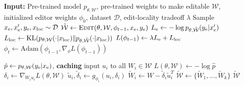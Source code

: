 \documentclass{article}
\begin{document}
\begin{minipage}[t]{0.43\textwidth}
\begin{algorithm}[H]
\caption{Editor Training}\label{alg:edit-procedure}
\begin{algorithmic}[1]



\State \textbf{Input:} Pre-trained model $p_{\theta,\mathcal{W}}$, pre-trained weights to make editable $\mathcal{W}$, initialized editor weights $\phi_0$, dataset $\mathcal{D}$, edit-locality tradeoff $\lambda$
    \State Sample $x_\text{e},x_\text{e}',y_\text{e},x_\text{loc}\sim \mathcal{D}$
    \State $\mathcal{\tilde W} \gets \textsc{Edit}(\theta,\mathcal{W},\phi_{t-1},x_\text{e},y_\text{e})$
    \State $L_\text{e} \gets -\log p_{\theta,\mathcal{\tilde W}}(y_\text{e}|x_\text{e}')$
    \State $L_\text{loc} \gets \text{KL}(p_{\theta,\mathcal{W}}(\cdot|x_\text{loc}) \| p_{\theta,\mathcal{\tilde W}}(\cdot|x_\text{loc}))$
    \State $L(\phi_{t-1}) \gets \lambda L_\text{e} + L_\text{loc}$
    \State $\phi_t \gets \text{Adam}\left(\phi_{t-1}, \nabla_\phi L(\phi_{t-1})\right)$
\EndFor





\end{algorithmic}
\end{algorithm}
\end{minipage}
\begin{minipage}[t]{0.565\textwidth}
\begin{algorithm}[H]
\caption{Edit Procedure}\label{alg:training}
\begin{algorithmic}[1]



    \State $\hat{p} \gets p_{\theta,\mathcal{W}}(y_\text{e}|x_\text{e})$, \textbf{caching} input $u_i$ to all $W_i\in\mathcal{W}$
    \State $L(\theta, \mathcal{W})\gets -\log \hat{p}$ 
        \State $\delta_i \gets \nabla_{W_iu_i} L(\theta, \mathcal{W})$ 
        \State $\tilde u_i,\tilde\delta_i \gets g_{\phi_i}(u_i,\delta_i)$ 
        \State $\tilde W_i \gets W - \tilde\delta_i\tilde u_i^T$
    \EndFor
    \State $\mathcal{\tilde{W}} \gets \{\tilde W_1,...,\tilde W_k\}$
    \State \Return $\mathcal{\tilde{W}}$ 
\EndProcedure



\end{algorithmic}
\end{algorithm}
\end{minipage}
\end{document}
